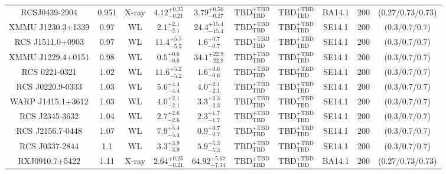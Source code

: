 \begin{table}
\begin{tabular}{cccccccccc}
RCSJ0439-2904 & 0.951 & X-ray & ${4.12}^{+0.25}_{-0.21}$ & ${3.79}^{+0.56}_{-0.27}$ & ${\mathrm{TBD}}^{+\mathrm{TBD}}_{\mathrm{TBD}}$ & ${\mathrm{TBD}}^{+\mathrm{TBD}}_{\mathrm{TBD}}$ & BA14.1 & 200 & (0.27/0.73/0.73) \\
XMMU J1230.3+1339 & 0.97 & WL & ${2.1}^{+2.1}_{-2.1}$ & ${24.4}^{+15.4}_{-15.4}$ & ${\mathrm{TBD}}^{+\mathrm{TBD}}_{\mathrm{TBD}}$ & ${\mathrm{TBD}}^{+\mathrm{TBD}}_{\mathrm{TBD}}$ & SE14.1 & 200 & (0.3/0.7/0.7) \\
RCS J1511.0+0903 & 0.97 & WL & ${11.4}^{+5.5}_{-5.5}$ & ${1.6}^{+0.7}_{-0.7}$ & ${\mathrm{TBD}}^{+\mathrm{TBD}}_{\mathrm{TBD}}$ & ${\mathrm{TBD}}^{+\mathrm{TBD}}_{\mathrm{TBD}}$ & SE14.1 & 200 & (0.3/0.7/0.7) \\
XMMU J1229.4+0151 & 0.98 & WL & ${0.5}^{+0.6}_{-0.6}$ & ${34.1}^{+22.9}_{-22.9}$ & ${\mathrm{TBD}}^{+\mathrm{TBD}}_{\mathrm{TBD}}$ & ${\mathrm{TBD}}^{+\mathrm{TBD}}_{\mathrm{TBD}}$ & SE14.1 & 200 & (0.3/0.7/0.7) \\
RCS 0221-0321 & 1.02 & WL & ${11.6}^{+5.2}_{-5.2}$ & ${1.6}^{+0.6}_{-0.6}$ & ${\mathrm{TBD}}^{+\mathrm{TBD}}_{\mathrm{TBD}}$ & ${\mathrm{TBD}}^{+\mathrm{TBD}}_{\mathrm{TBD}}$ & SE14.1 & 200 & (0.3/0.7/0.7) \\
RCS J0220.9-0333 & 1.03 & WL & ${5.6}^{+4.4}_{-4.4}$ & ${4.0}^{+2.1}_{-2.1}$ & ${\mathrm{TBD}}^{+\mathrm{TBD}}_{\mathrm{TBD}}$ & ${\mathrm{TBD}}^{+\mathrm{TBD}}_{\mathrm{TBD}}$ & SE14.1 & 200 & (0.3/0.7/0.7) \\
WARP J1415.1+3612 & 1.03 & WL & ${4.0}^{+2.1}_{-2.1}$ & ${3.3}^{+2.3}_{-2.3}$ & ${\mathrm{TBD}}^{+\mathrm{TBD}}_{\mathrm{TBD}}$ & ${\mathrm{TBD}}^{+\mathrm{TBD}}_{\mathrm{TBD}}$ & SE14.1 & 200 & (0.3/0.7/0.7) \\
RCS J2345-3632 & 1.04 & WL & ${2.7}^{+2.6}_{-2.6}$ & ${2.3}^{+1.7}_{-1.7}$ & ${\mathrm{TBD}}^{+\mathrm{TBD}}_{\mathrm{TBD}}$ & ${\mathrm{TBD}}^{+\mathrm{TBD}}_{\mathrm{TBD}}$ & SE14.1 & 200 & (0.3/0.7/0.7) \\
RCS J2156.7-0448 & 1.07 & WL & ${7.9}^{+5.4}_{-5.4}$ & ${0.9}^{+0.7}_{-0.7}$ & ${\mathrm{TBD}}^{+\mathrm{TBD}}_{\mathrm{TBD}}$ & ${\mathrm{TBD}}^{+\mathrm{TBD}}_{\mathrm{TBD}}$ & SE14.1 & 200 & (0.3/0.7/0.7) \\
RCS J0337-2844 & 1.1 & WL & ${3.3}^{+3.9}_{-3.9}$ & ${5.9}^{+5.3}_{-5.3}$ & ${\mathrm{TBD}}^{+\mathrm{TBD}}_{\mathrm{TBD}}$ & ${\mathrm{TBD}}^{+\mathrm{TBD}}_{\mathrm{TBD}}$ & SE14.1 & 200 & (0.3/0.7/0.7) \\
RXJ0910.7+5422 & 1.11 & X-ray & ${2.64}^{+0.25}_{-0.21}$ & ${64.92}^{+5.67}_{-7.34}$ & ${\mathrm{TBD}}^{+\mathrm{TBD}}_{\mathrm{TBD}}$ & ${\mathrm{TBD}}^{+\mathrm{TBD}}_{\mathrm{TBD}}$ & BA14.1 & 200 & (0.27/0.73/0.73) \\

\end{tabular}
\end{table}
